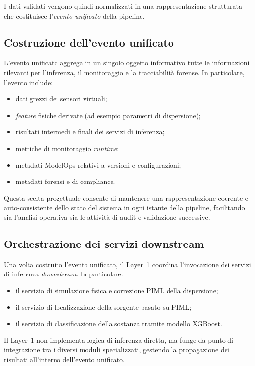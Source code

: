 I dati validati vengono quindi normalizzati in una rappresentazione strutturata che costituisce l’\emph{evento unificato} della pipeline.

\subsection{Costruzione dell’evento unificato}

L’evento unificato aggrega in un singolo oggetto informativo tutte le informazioni rilevanti per l’inferenza, il monitoraggio e la tracciabilità forense.
In particolare, l’evento include:
\begin{itemize}
	\item dati grezzi dei sensori virtuali;
	\item \textit{feature} fisiche derivate (ad esempio parametri di dispersione);
	\item risultati intermedi e finali dei servizi di inferenza;
	\item metriche di monitoraggio \textit{runtime};
	\item metadati ModelOps relativi a versioni e configurazioni;
	\item metadati forensi e di compliance.
\end{itemize}

Questa scelta progettuale consente di mantenere una rappresentazione coerente e auto-consistente dello stato del sistema in ogni istante della pipeline, facilitando sia l’analisi operativa sia le attività di audit e validazione successive.

\subsection{Orchestrazione dei servizi downstream}

Una volta costruito l’evento unificato, il Layer~1 coordina l’invocazione dei servizi di inferenza \textit{downstream}.
In particolare:
\begin{itemize}
	\item il servizio di simulazione fisica e correzione PIML della dispersione;
	\item il servizio di localizzazione della sorgente basato su PIML;
	\item il servizio di classificazione della sostanza tramite modello XGBoost.
\end{itemize}

Il Layer~1 non implementa logica di inferenza diretta, ma funge da punto di integrazione tra i diversi moduli specializzati, gestendo la propagazione dei risultati all’interno dell’evento unificato.

